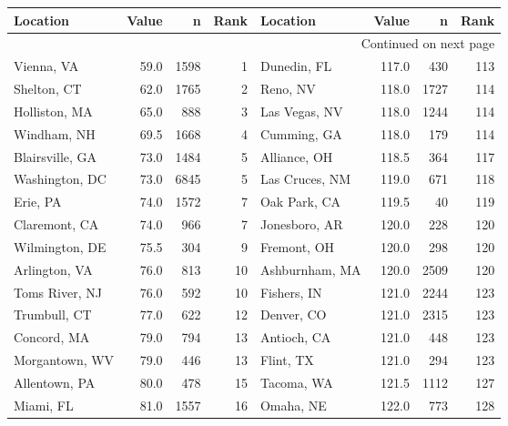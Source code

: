 \begin{longtable}{lrrr|lrrr}
\toprule
\textbf{Location} & \textbf{Value} & \textbf{n} & \textbf{Rank} & \textbf{Location} & \textbf{Value} & \textbf{n} & \textbf{Rank} \\
\midrule
\endhead
\midrule
\multicolumn{8}{r}{{Continued on next page}} \\
\midrule
\endfoot

\bottomrule
\endlastfoot
Vienna, VA           &    59.0 &   1598 &     1 & Dunedin, FL          &   117.0 &    430 &   113 \\
Shelton, CT          &    62.0 &   1765 &     2 & Reno, NV             &   118.0 &   1727 &   114 \\
Holliston, MA        &    65.0 &    888 &     3 & Las Vegas, NV        &   118.0 &   1244 &   114 \\
Windham, NH          &    69.5 &   1668 &     4 & Cumming, GA          &   118.0 &    179 &   114 \\
Blairsville, GA      &    73.0 &   1484 &     5 & Alliance, OH         &   118.5 &    364 &   117 \\
Washington, DC       &    73.0 &   6845 &     5 & Las Cruces, NM       &   119.0 &    671 &   118 \\
Erie, PA             &    74.0 &   1572 &     7 & Oak Park, CA         &   119.5 &     40 &   119 \\
Claremont, CA        &    74.0 &    966 &     7 & Jonesboro, AR        &   120.0 &    228 &   120 \\
Wilmington, DE       &    75.5 &    304 &     9 & Fremont, OH          &   120.0 &    298 &   120 \\
Arlington, VA        &    76.0 &    813 &    10 & Ashburnham, MA       &   120.0 &   2509 &   120 \\
Toms River, NJ       &    76.0 &    592 &    10 & Fishers, IN          &   121.0 &   2244 &   123 \\
Trumbull, CT         &    77.0 &    622 &    12 & Denver, CO           &   121.0 &   2315 &   123 \\
Concord, MA          &    79.0 &    794 &    13 & Antioch, CA          &   121.0 &    448 &   123 \\
Morgantown, WV       &    79.0 &    446 &    13 & Flint, TX            &   121.0 &    294 &   123 \\
Allentown, PA        &    80.0 &    478 &    15 & Tacoma, WA           &   121.5 &   1112 &   127 \\
Miami, FL            &    81.0 &   1557 &    16 & Omaha, NE            &   122.0 &    773 &   128 \\

\end{longtable}

